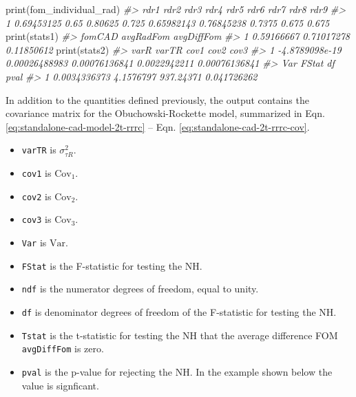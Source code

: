 \documentclass[
]{book}
\newenvironment{Shaded}{\begin{snugshade}}{\end{snugshade}}
\newcommand{\CommentTok}[1]{\textcolor[rgb]{0.56,0.35,0.01}{\textit{#1}}}
\newcommand{\FunctionTok}[1]{\textcolor[rgb]{0.00,0.00,0.00}{#1}}
\newcommand{\NormalTok}[1]{#1}
\providecommand{\tightlist}{%
  \setlength{\itemsep}{0pt}\setlength{\parskip}{0pt}}
\begin{document}
\begin{Shaded}
\begin{Highlighting}[]

\FunctionTok{print}\NormalTok{(fom\_individual\_rad)}
\CommentTok{\#\textgreater{}         rdr1 rdr2    rdr3  rdr4       rdr5       rdr6   rdr7  rdr8  rdr9}
\CommentTok{\#\textgreater{} 1 0.69453125 0.65 0.80625 0.725 0.65982143 0.76845238 0.7375 0.675 0.675}
\FunctionTok{print}\NormalTok{(stats1)}
\CommentTok{\#\textgreater{}       fomCAD  avgRadFom avgDiffFom}
\CommentTok{\#\textgreater{} 1 0.59166667 0.71017278 0.11850612}
\FunctionTok{print}\NormalTok{(stats2)}
\CommentTok{\#\textgreater{}             varR         varTR          cov1         cov2          cov3}
\CommentTok{\#\textgreater{} 1 {-}4.8789098e{-}19 0.00026488983 0.00076136841 0.0022942211 0.00076136841}
\CommentTok{\#\textgreater{}            Var     FStat        df        pval}
\CommentTok{\#\textgreater{} 1 0.0034336373 4.1576797 937.24371 0.041726262}
\end{Highlighting}
\end{Shaded}

In addition to the quantities defined previously, the output contains the covariance matrix for the Obuchowski-Rockette model, summarized in Eqn. \eqref{eq:standalone-cad-model-2t-rrrc} -- Eqn. \eqref{eq:standalone-cad-2t-rrrc-cov}.

\begin{itemize}
\tightlist
\item
  \texttt{varTR} is \(\sigma_{\tau R}^2\).
\item
  \texttt{cov1} is \(\text{Cov}_1\).
\item
  \texttt{cov2} is \(\text{Cov}_2\).
\item
  \texttt{cov3} is \(\text{Cov}_3\).
\item
  \texttt{Var} is \(\text{Var}\).
\item
  \texttt{FStat} is the F-statistic for testing the NH.
\item
  \texttt{ndf} is the numerator degrees of freedom, equal to unity.
\item
  \texttt{df} is denominator degrees of freedom of the F-statistic for testing the NH.
\item
  \texttt{Tstat} is the t-statistic for testing the NH that the average difference FOM \texttt{avgDiffFom} is zero.
\item
  \texttt{pval} is the p-value for rejecting the NH. In the example shown below the value is signficant.
\end{itemize}
\end{document}
